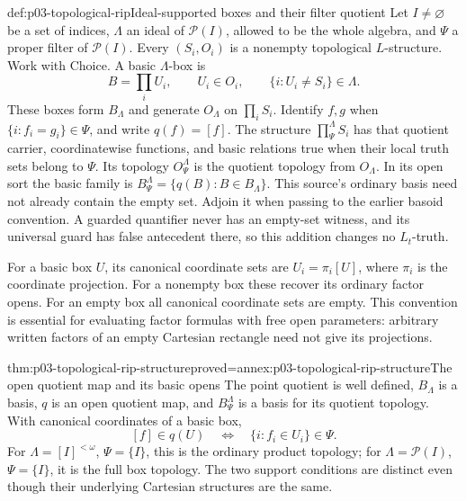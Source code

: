 \begin{hbdefinition}{def:p03-topological-rip}{Ideal-supported boxes and their filter quotient}
Let \(I\ne\varnothing\) be a set of indices, \(\Lambda\) an ideal
of \(\mathcal P(I)\), allowed to be the whole algebra, and
\(\Psi\) a proper filter of \(\mathcal P(I)\). Every
\((S_i,O_i)\) is a nonempty topological \(L\)-structure. Work with
Choice. A basic \(\Lambda\)-box is
\[
       B=\prod_i U_i,\qquad U_i\in O_i,\qquad
                \{i:U_i\ne S_i\}\in\Lambda.
\]
These boxes form \(B_\Lambda\) and generate \(O_\Lambda\) on
\(\prod_i S_i\). Identify \(f,g\) when
\(\{i:f_i=g_i\}\in\Psi\), and write \(q(f)=[f]\).
The structure \(\prod^\Lambda_\Psi S_i\) has that quotient carrier,
coordinatewise functions, and basic relations true when their local truth
sets belong to \(\Psi\). Its topology \(O^\Lambda_\Psi\) is the
quotient topology from \(O_\Lambda\).
In its open sort the basic family is
\(B^\Lambda_\Psi=\{q(B):B\in B_\Lambda\}\).
This source's ordinary basis need not already contain the empty set.
Adjoin it when passing to the earlier basoid convention. A guarded
quantifier never has an empty-set witness, and its universal guard has
false antecedent there, so this addition changes no \(L_t\)-truth.

For a basic box \(U\), its canonical coordinate sets are
\(U_i=\pi_i[U]\), where \(\pi_i\) is the coordinate projection.
For a nonempty box these recover its ordinary factor opens. For an empty
box all canonical coordinate sets are empty. This convention is essential
for evaluating factor formulas with free open parameters: arbitrary written
factors of an empty Cartesian rectangle need not give its projections.
\end{hbdefinition}

\begin{hbtheorem}{thm:p03-topological-rip-structure}{proved=annex:p03-topological-rip-structure}{The open quotient map and its basic opens}
The point quotient is well defined, \(B_\Lambda\) is a basis, \(q\)
is an open quotient map, and \(B^\Lambda_\Psi\) is a basis for its
quotient topology. With canonical coordinates of a basic box,
\[
                 [f]\in q(U)
              \quad\Longleftrightarrow\quad
                 \{i:f_i\in U_i\}\in\Psi.
\]
For \(\Lambda=[I]^{<\omega}\), \(\Psi=\{I\}\), this is the
ordinary product topology; for \(\Lambda=\mathcal P(I)\),
\(\Psi=\{I\}\), it is the full box topology. The two support
conditions are distinct even though their underlying Cartesian structures
are the same.
\end{hbtheorem}

